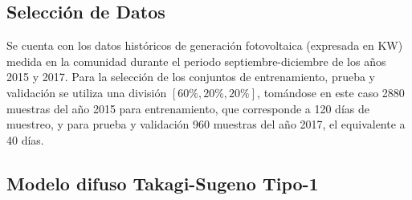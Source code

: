 \documentclass[12pt]{article}
\begin{document}
\subsection{Selección de Datos}
Se cuenta con los datos históricos de generación fotovoltaica (expresada en KW) medida en la comunidad durante el periodo septiembre-diciembre de los años 2015 y 2017. Para la selección de los conjuntos de entrenamiento, prueba y validación se utiliza una división $[60\%,20\%,20\%]$, tomándose en este caso 2880 muestras del año 2015 para entrenamiento, que corresponde a 120 días de muestreo, y para prueba y validación 960 muestras del año 2017, el equivalente a 40 días.
				
\subsection{Modelo difuso Takagi-Sugeno Tipo-1}
\end{document}
